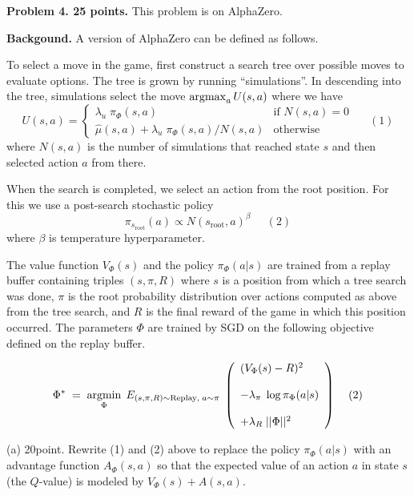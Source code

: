 \documentclass{article}
\begin{document}
  
\bigskip
{\bf Problem 4. 25 points.}
This problem is on AlphaZero.

\medskip
{\bf Backgound.}
A version of AlphaZero can be defined as follows.

\medskip
To select a move in the game, first construct a search tree over possible moves to evaluate options.
The tree is grown by running ``simulations''. 
In descending into the tree, simulations select the move $\operatorname*{argmax}_a U(s,a)$ where we have
$$U(s,a) =  \left\{\begin{array}{ll}\lambda_u\; \pi_\Phi(s,a) &\mbox{if $N(s,a) = 0$} \\ \hat{\mu}(s,a) + \lambda_u\; \pi_\Phi(s,a)/N(s,a) & \mbox{otherwise} \end{array}\right.\;\;\;\;\;(1)$$
where $N(s,a)$ is the number of simulations that reached state $s$ and then selected action $a$ from there.

\medskip
When the search is completed, we select an action from the root position.  For this we use a post-search stochastic policy
$$\pi_{s_{\mathrm{root}}}(a) \propto N(s_{\mathrm{root}},a)^\beta\;\;\;\;\;(2)$$
where $\beta$ is temperature hyperparameter.

\medskip
The value function $V_\Phi(s)$ and the policy $\pi_\Phi(a|s)$ are trained from a replay buffer containing triples $(s,\pi,R)$ where $s$ is a position from which a tree search was done,
$\pi$ is the root probability distribution over actions computed as above from the tree search, and $R$ is the final reward of the game in which this position occurred.
The parameters $\Phi$ are trained by SGD on the following objective defined on the replay buffer.

$$\Phi^*\; = \;\operatorname*{argmin}_\Phi \;E_{(s,\pi,R) \sim \mathrm{Replay},\;a \sim \pi}\;\left(\begin{array}{l} (V_\Phi(s) - R)^2 \\ \\ - \lambda_\pi\;\log \pi_\Phi(a|s) \\ \\ + \lambda_R\;||\Phi||^2\end{array}\right)\;\;\;\;(2)$$
  
(a) 20point. Rewrite (1) and (2) above to replace the policy $\pi_\Phi(a|s)$ with an advantage function $A_\Phi(s,a)$ so that the expected value of an action $a$ in state $s$ (the $Q$-value)
  is modeled by $V_\Phi(s) + A(s,a)$.
\end{document}
